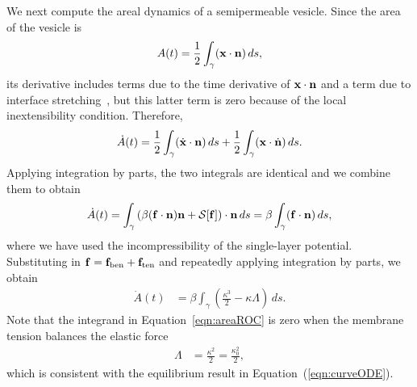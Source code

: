 \documentclass[prb,preprint,showpacs,preprintnumbers,amsmath,amssymb,longbibliography]{revtex4-1}
\begin{document}
We next compute the areal dynamics of a semipermeable vesicle. Since the
area of the vesicle is
\begin{align}
  A(t) = \frac{1}{2}\int_{\gamma} (\mathbf{x} \cdot \mathbf{n})\, ds,
  \label{eqn:area}
\end{align}
its derivative includes terms due to the time derivative of $\mathbf{x} \cdot
\mathbf{n}$ and a term due to interface stretching~\cite{lai-tse-hua2008}, but
this latter term is zero because of the local inextensibility condition.
Therefore,
\begin{align}
  \dot{A}(t) =
  \frac{1}{2} \int_{\gamma} (\dot{\mathbf{x}} \cdot \mathbf{n})\, ds  + 
  \frac{1}{2} \int_{\gamma} (\mathbf{x} \cdot \dot{\mathbf{n}})\, ds.
\end{align}
Applying integration by parts, the two integrals are identical and we combine them to obtain
\begin{align}
  \dot{A}(t) = \int_\gamma \left(\beta (\mathbf{f} \cdot \mathbf{n})\mathbf{n} 
    + \mathcal{S}[\mathbf{f}]\right) \cdot \mathbf{n}\, ds 
  = \beta \int_\gamma (\mathbf{f} \cdot \mathbf{n})\, ds,
  \label{eqn:areaROCforce}
\end{align}
where we have used the incompressibility of the single-layer potential.
Substituting in $\mathbf{f} = \mathbf{f}_\mathrm{ben} + \mathbf{f}_\mathrm{ten}$ and
repeatedly applying integration by parts, we obtain
\begin{align}
  \dot{A}(t) & = \beta \int_\gamma \left(
    \frac{\kappa^3}{2} - \kappa \Lambda \right) \, ds.
  \label{eqn:areaROC}
\end{align}
Note that the integrand in Equation~\eqref{eqn:areaROC} is zero when the membrane tension balances the elastic force
\begin{align}
\label{eqn:areaROC2}
\Lambda &= \frac{\kappa^2}{2}=\frac{\kappa_0^2}{2},
\end{align}
which is consistent with the equilibrium result in
Equation~(\ref{eqn:curveODE}).
\end{document}
